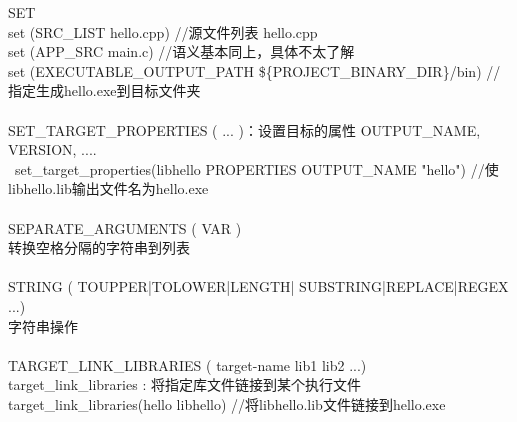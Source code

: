 \documentclass[11pt,a4paper,titlepage]{article}
\begin{document}
SET\\
set (SRC\_LIST hello.cpp)  //源文件列表 hello.cpp\\
set (APP\_SRC main.c)       //语义基本同上，具体不太了解\\
set (EXECUTABLE\_OUTPUT\_PATH \$\{PROJECT\_BINARY\_DIR\}/bin)  //指定生成hello.exe到目标文件夹\\
\\
SET\_TARGET\_PROPERTIES ( ... )：设置目标的属性 OUTPUT\_NAME, VERSION, ....\\\
set\_target\_properties(libhello PROPERTIES OUTPUT\_NAME "hello")  //使libhello.lib输出文件名为hello.exe\\
\\
SEPARATE\_ARGUMENTS ( VAR )\\
转换空格分隔的字符串到列表\\
\\
STRING ( TOUPPER|TOLOWER|LENGTH| SUBSTRING|REPLACE|REGEX ...)\\
字符串操作\\
\\
TARGET\_LINK\_LIBRARIES ( target-name lib1 lib2 ...)\\
target\_link\_libraries  :  将指定库文件链接到某个执行文件\\
target\_link\_libraries(hello libhello)   //将libhello.lib文件链接到hello.exe\\
\end{document}

